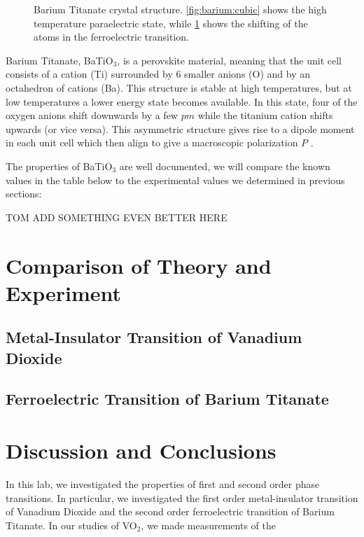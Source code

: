 \documentclass[%
 reprint,
 amsmath,amssymb,
 aps,
 pra,
]{revtex4-1}
\begin{document}
\begin{figure}[H]
\begin{subfigure}{0.24\textwidth}
		\caption{}
		\label{fig:barium:transition}
	\end{subfigure}
	\caption{Barium Titanate crystal structure. \ref{fig:barium:cubic} shows the high temperature paraelectric state, while \ref{fig:barium:transition} shows the shifting of the atoms in the ferroelectric transition.}
	\label{fig:barium}
\end{figure}

Barium Titanate, BaTiO$_3$, is a perovskite material, meaning that the unit cell consists of a cation (Ti) surrounded by 6 smaller anions (O) and by an octahedron of cations (Ba). This structure is stable at high temperatures, but at low temperatures a lower energy state becomes available. In this state, four of the oxygen anions shift downwards by a few $pm$ while the titanium cation shifts upwards (or vice versa). This asymmetric structure gives rise to a dipole moment in each unit cell which then align to give a macroscopic polarization $P$ \cite{manual}. 

The properties of BaTiO$_3$ are well documented, we will compare the known values in the table below to the experimental values we determined in previous sections:

\begin{Huge}
TOM ADD SOMETHING EVEN BETTER HERE
\end{Huge}

\section{Comparison of Theory and Experiment}

\subsection{Metal-Insulator Transition of Vanadium Dioxide}

\subsection{Ferroelectric Transition of Barium Titanate}

\section{Discussion and Conclusions}

In this lab, we investigated the properties of first and second order phase transitions. In particular, we investigated the first order metal-insulator transition of Vanadium Dioxide and the second order ferroelectric transition of Barium Titanate. In our studies of VO$_2$, we made measurements of the 
\end{document}

